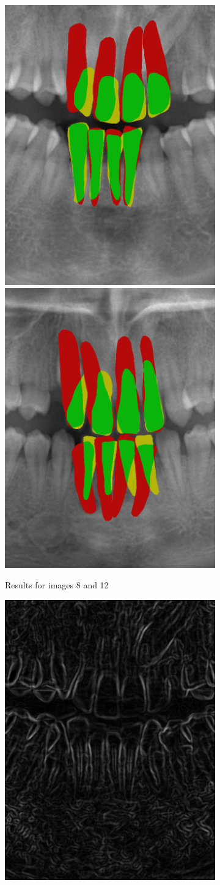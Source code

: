 \documentclass[a4paper,titlepage,12pt]{article}
\begin{document}
\begin{figure}
	\begin{subfigure}{0.48\linewidth}
		\centering
		\includegraphics[width=0.48\columnwidth]{results/8i10}
		\includegraphics[width=0.48\columnwidth]{results/12i10}
		\caption{Results for images 8 and 12}
	\end{subfigure}
	\begin{subfigure}{0.48\linewidth}
		\centering
		\includegraphics[width=0.48\columnwidth]{results/8sobel}

\end{subfigure}
\end{figure}
\end{document}
